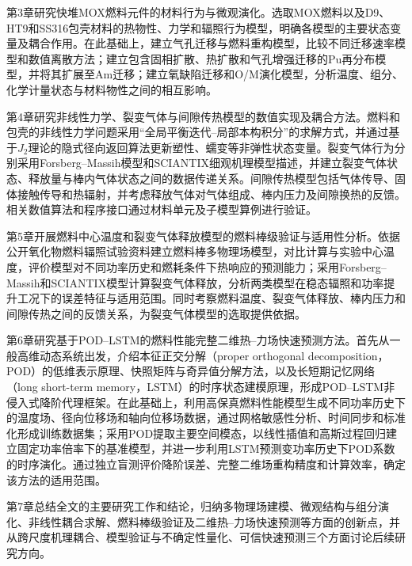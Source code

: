 第3章研究快堆MOX燃料元件的材料行为与微观演化。选取MOX燃料以及D9、HT9和SS316包壳材料的热物性、力学和辐照行为模型，明确各模型的主要状态变量及耦合作用。在此基础上，建立气孔迁移与燃料重构模型，比较不同迁移速率模型和数值离散方法；建立包含固相扩散、热扩散和气孔增强迁移的Pu再分布模型，并将其扩展至Am迁移；建立氧缺陷迁移和O/M演化模型，分析温度、组分、化学计量状态与材料物性之间的相互影响。

第4章研究非线性力学、裂变气体与间隙传热模型的数值实现及耦合方法。燃料和包壳的非线性力学问题采用“全局平衡迭代--局部本构积分”的求解方式，并通过基于$J_2$理论的隐式径向返回算法更新塑性、蠕变等非弹性状态变量。裂变气体行为分别采用Forsberg--Massih模型和SCIANTIX细观机理模型描述，并建立裂变气体状态、释放量与棒内气体状态之间的数据传递关系。间隙传热模型包括气体传导、固体接触传导和热辐射，并考虑释放气体对气体组成、棒内压力及间隙换热的反馈。相关数值算法和程序接口通过材料单元及子模型算例进行验证。

第5章开展燃料中心温度和裂变气体释放模型的燃料棒级验证与适用性分析。依据公开氧化物燃料辐照试验资料建立燃料棒多物理场模型，对比计算与实验中心温度，评价模型对不同功率历史和燃耗条件下热响应的预测能力；采用Forsberg--Massih和SCIANTIX模型计算裂变气体释放，分析两类模型在稳态辐照和功率提升工况下的误差特征与适用范围。同时考察燃料温度、裂变气体释放、棒内压力和间隙传热之间的反馈关系，为裂变气体模型的选取提供依据。

第6章研究基于POD--LSTM的燃料性能完整二维热--力场快速预测方法。首先从一般高维动态系统出发，介绍本征正交分解（proper orthogonal decomposition，POD）的低维表示原理、快照矩阵与奇异值分解方法，以及长短期记忆网络（long short-term memory，LSTM）的时序状态建模原理，形成POD--LSTM非侵入式降阶代理框架。在此基础上，利用高保真燃料性能模型生成不同功率历史下的温度场、径向位移场和轴向位移场数据，通过网格敏感性分析、时间同步和标准化形成训练数据集；采用POD提取主要空间模态，以线性插值和高斯过程回归建立固定功率倍率下的基准模型，并进一步利用LSTM预测变功率历史下POD系数的时序演化。通过独立盲测评价降阶误差、完整二维场重构精度和计算效率，确定该方法的适用范围。

第7章总结全文的主要研究工作和结论，归纳多物理场建模、微观结构与组分演化、非线性耦合求解、燃料棒级验证及二维热--力场快速预测等方面的创新点，并从跨尺度机理耦合、模型验证与不确定性量化、可信快速预测三个方面讨论后续研究方向。
